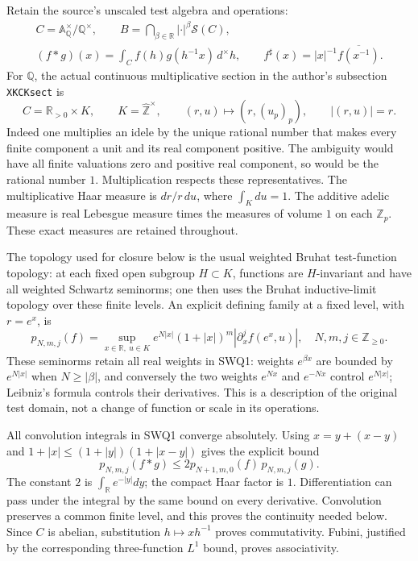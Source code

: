 \documentclass[11pt]{article}
\begin{document}
Retain the source's unscaled test algebra and operations:
\begin{equation}\tag{SWQ1}
\begin{gathered}
 C=\mathbb A_{\mathbb Q}^{\times}/\mathbb Q^{\times},\qquad
 B=\bigcap_{\beta\in\mathbb R}|\cdot|^\beta\mathcal S(C),\\
 (f*g)(x)=\int_C f(h)g(h^{-1}x)\,d^{\times}h,\qquad
 f^{\sharp}(x)=|x|^{-1}\overline{f(x^{-1})}.
\end{gathered}
\end{equation}
For $\mathbb Q$, the actual continuous multiplicative section in
the author's subsection \texttt{XKCKsect} is
\begin{equation}\tag{SWQ2}
 C=\mathbb R_{>0}\times K,\qquad K=\widehat{\mathbb Z}^{\times},
 \qquad (r,u)\longmapsto(r,(u_p)_p),
 \qquad |(r,u)|=r.
\end{equation}
Indeed one multiplies an idele by the unique rational number that
makes every finite component a unit and its real component positive.
The ambiguity would have all finite valuations zero and positive real
component, so would be the rational number $1$. Multiplication
respects these representatives. The multiplicative Haar measure is
$dr/r\,du$, where $\int_Kdu=1$. The additive adelic measure is real
Lebesgue measure times the measures of volume $1$ on each
$\mathbb Z_p$. These exact measures are retained throughout.

The topology used for closure below is the usual weighted Bruhat
test-function topology: at each fixed open subgroup $H\subset K$,
functions are $H$-invariant and have all weighted Schwartz seminorms;
one then uses the Bruhat inductive-limit topology over these finite
levels. An explicit defining family at a fixed level, with $r=e^x$, is
\begin{equation}\tag{SWQ3}
 p_{N,m,j}(f)=\sup_{x\in\mathbb R,\ u\in K}
 e^{N|x|}(1+|x|)^m
 \left|\partial_x^j f(e^x,u)\right|,
 \quad N,m,j\in\mathbb Z_{\ge0}.
\end{equation}
These seminorms retain all real weights in SWQ1: weights $e^{\beta x}$
are bounded by $e^{N|x|}$ when $N\ge|\beta|$, and conversely the two
weights $e^{Nx}$ and $e^{-Nx}$ control $e^{N|x|}$; Leibniz's formula
controls their derivatives. This is a description of the original
test domain, not a change of function or scale in its operations.

All convolution integrals in SWQ1 converge absolutely. Using
$x=y+(x-y)$ and $1+|x|\le(1+|y|)(1+|x-y|)$ gives the explicit bound
\begin{equation}\tag{SWQ4}
 p_{N,m,j}(f*g)
 \le 2p_{N+1,m,0}(f)\,p_{N,m,j}(g).
\end{equation}
The constant $2$ is $\int_{\mathbb R}e^{-|y|}dy$; the compact Haar
factor is $1$. Differentiation can pass under the integral by the
same bound on every derivative. Convolution preserves a common
finite level, and this proves the continuity needed below. Since
$C$ is abelian, substitution $h\mapsto xh^{-1}$ proves commutativity.
Fubini, justified by the corresponding three-function $L^1$ bound,
proves associativity.
\end{document}
